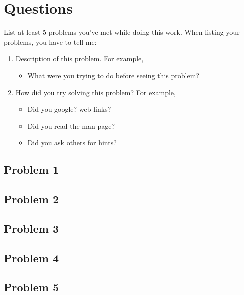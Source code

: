 \documentclass{swfulabreport}
\begin{document}
\section{Questions}\label{questions}

List at least 5 problems you've met while doing this work. When listing
your problems, you have to tell me:

\begin{enumerate}
\def\labelenumi{\arabic{enumi}.}
\item
  Description of this problem. For example,

  \begin{itemize}
  \tightlist
  \item
    What were you trying to do before seeing this problem?
  \end{itemize}
\item
  How did you try solving this problem? For example,

  \begin{itemize}
  \tightlist
  \item
    Did you google? web links?
  \item
    Did you read the man page?
  \item
    Did you ask others for hints?
  \end{itemize}
\end{enumerate}

\subsection{Problem 1}\label{problem-1}

\subsection{Problem 2}\label{problem-2}

\subsection{Problem 3}\label{problem-3}

\subsection{Problem 4}\label{problem-4}

\subsection{Problem 5}\label{problem-5}
\end{document}

